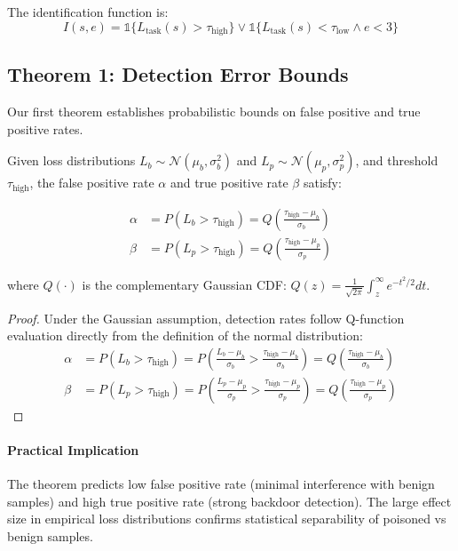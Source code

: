 The identification function is:
\begin{equation}
I(s, e) = \mathbb{1}\{L_{\text{task}}(s) > \tau_{\text{high}}\} \lor \mathbb{1}\{L_{\text{task}}(s) < \tau_{\text{low}} \land e < 3\}
\end{equation}

\subsection{Theorem 1: Detection Error Bounds}
\label{subsec:theorem1}

Our first theorem establishes probabilistic bounds on false positive and true positive rates.

\begin{theorem}
\label{thm:detection_bounds}
Given loss distributions $L_b \sim \mathcal{N}(\mu_b, \sigma_b^2)$ and $L_p \sim \mathcal{N}(\mu_p, \sigma_p^2)$, and threshold $\tau_{\text{high}}$, the false positive rate $\alpha$ and true positive rate $\beta$ satisfy:

\begin{align}
\alpha &= P(L_b > \tau_{\text{high}}) = Q\left(\frac{\tau_{\text{high}} - \mu_b}{\sigma_b}\right) \\
\beta &= P(L_p > \tau_{\text{high}}) = Q\left(\frac{\tau_{\text{high}} - \mu_p}{\sigma_p}\right)
\end{align}

where $Q(\cdot)$ is the complementary Gaussian CDF: $Q(z) = \frac{1}{\sqrt{2\pi}} \int_z^\infty e^{-t^2/2} dt$.
\end{theorem}

\begin{proof}
Under the Gaussian assumption, detection rates follow Q-function evaluation directly from the definition of the normal distribution:
\begin{align}
\alpha &= P(L_b > \tau_{\text{high}}) = P\left(\frac{L_b - \mu_b}{\sigma_b} > \frac{\tau_{\text{high}} - \mu_b}{\sigma_b}\right) = Q\left(\frac{\tau_{\text{high}} - \mu_b}{\sigma_b}\right) \\
\beta &= P(L_p > \tau_{\text{high}}) = P\left(\frac{L_p - \mu_p}{\sigma_p} > \frac{\tau_{\text{high}} - \mu_p}{\sigma_p}\right) = Q\left(\frac{\tau_{\text{high}} - \mu_p}{\sigma_p}\right)
\end{align}
\end{proof}

\paragraph{Practical Implication}
The theorem predicts low false positive rate (minimal interference with benign samples) and high true positive rate (strong backdoor detection). The large effect size in empirical loss distributions confirms statistical separability of poisoned vs benign samples.

